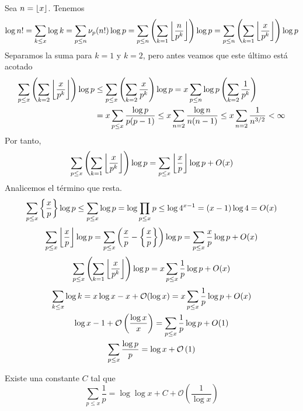 \documentclass[TAN.tex]{subfiles}
\begin{document}
\begin{dem}
Sea $n=\left\lfloor{x}\right\rfloor$. Tenemos
$$
\log n! = \sum_{k\leq x} \log k = \sum_{p\leq n}\nu_p(n!)\log p = \sum_{p\leq n}\left(\sum_{k=1}\left\lfloor{\frac{n}{p^k}}\right\rfloor\right)\log p
=  \sum_{p\leq n}\left(\sum_{k=1}\left\lfloor{\frac{x}{p^k}}\right\rfloor\right)\log p$$
Separamos la suma para $k=1$ y $k=2$, pero antes veamos que este último está acotado
\begin{align*}
\sum_{p\leq x}\left(\sum_{k=2}\left\lfloor{\frac{x}{p^k}}\right\rfloor\right)\log p &\leq \sum_{p\leq x}\left(\sum_{k=2}\frac{x}{p^k}\right)\log p = x\sum_{p\leq n}\log p\left(\sum_{k=2}\frac{1}{p^k}\right)\\
&= x\sum_{p\leq x} \frac{\log p }{p(p-1)} \leq x\sum_{n=2} \frac{\log n}{n(n-1)}\leq x \sum_{n=2}\frac{1}{n^{3/2}}<\infty
\end{align*}
Por tanto,
$$
\sum_{p\leq x}\left(\sum_{k=1}\left\lfloor{\frac{x}{p^k}}\right\rfloor\right)\log p = \sum_{p\leq x}\left\lfloor{\frac{x}{p}}\right\rfloor\log p+O(x)
$$
Analicemos el término que resta.
$$
\sum_{p\leq x}\left\{{\frac{x}{p}}\right\}\log p \leq \sum_{p\leq x}\log p = \log \prod_{p\leq x} p \leq \log 4^{x-1} =(x-1)\log 4 = O(x)
$$
\begin{align*}
\sum_{p\leq x}\left\lfloor{\frac{x}{p}}\right\rfloor\log p = \sum_{p\leq x}\left(\frac{x}{p}-\left\{{\frac{x}{p}}\right\}\right)\log p = \sum_{p\leq x}{\frac{x}{p}}\log p + O(x) 
\end{align*}
$$
\sum_{p\leq x}\left(\sum_{k=1}\left\lfloor{\frac{x}{p^k}}\right\rfloor\right)\log p = x\sum_{p\leq x}\frac{1}{p}\log p+O(x)
$$
\begin{gather*}
\sum_{k\leq x}\log k = x\log x -x+ \mathcal{O}(\log x)  = x\sum_{p\leq x}\frac{1}{p}\log p+O(x)\\
 \log x -1+ \mathcal{O}\left({\frac{\log x}{x}}\right)  = \sum_{p\leq x}\frac{1}{p}\log p+O(1)\\
 \sum_{p\leq x}\frac{\log p}{p} = \log x + \mathcal{O}\left({1}\right)
\end{gather*}
\end{dem}
\begin{teorema}[Mertens]
Existe una constante $C$ tal que
\[ \sum_{p≤x} \frac{1}{p} = \log \log x + C + \mathcal{O}\left(\frac{1}{\log x}\right) \]
\end{teorema}
\end{document}
